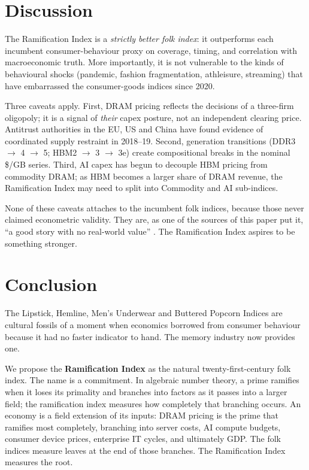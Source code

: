\documentclass[11pt,a4paper]{article}
\begin{document}
\section{Discussion}\label{sec:discussion}

The Ramification Index is a \emph{strictly better folk index}: it outperforms each incumbent consumer-behaviour proxy on coverage, timing, and correlation with macroeconomic truth. More importantly, it is not vulnerable to the kinds of behavioural shocks (pandemic, fashion fragmentation, athleisure, streaming) that have embarrassed the consumer-goods indices since 2020.

Three caveats apply. First, DRAM pricing reflects the decisions of a three-firm oligopoly; it is a signal of \emph{their} capex posture, not an independent clearing price. Antitrust authorities in the EU, US and China have found evidence of coordinated supply restraint in 2018--19. Second, generation transitions (DDR3 $\rightarrow$ 4 $\rightarrow$ 5; HBM2 $\rightarrow$ 3 $\rightarrow$ 3e) create compositional breaks in the nominal \$/GB series. Third, AI capex has begun to decouple HBM pricing from commodity DRAM; as HBM becomes a larger share of DRAM revenue, the Ramification Index may need to split into Commodity and AI sub-indices.

None of these caveats attaches to the incumbent folk indices, because those never claimed econometric validity. They are, as one of the sources of this paper put it, ``a good story with no real-world value'' \citep{baardwijk2010}. The Ramification Index aspires to be something stronger.

\section{Conclusion}\label{sec:conclusion}

The Lipstick, Hemline, Men's Underwear and Buttered Popcorn Indices are cultural fossils of a moment when economics borrowed from consumer behaviour because it had no faster indicator to hand. The memory industry now provides one.

We propose the \textbf{Ramification Index} as the natural twenty-first-century folk index. The name is a commitment. In algebraic number theory, a prime ramifies when it loses its primality and branches into factors as it passes into a larger field; the ramification index measures how completely that branching occurs. An economy is a field extension of its inputs: DRAM pricing is the prime that ramifies most completely, branching into server costs, AI compute budgets, consumer device prices, enterprise IT cycles, and ultimately GDP. The folk indices measure leaves at the end of those branches. The Ramification Index measures the root.
\end{document}
